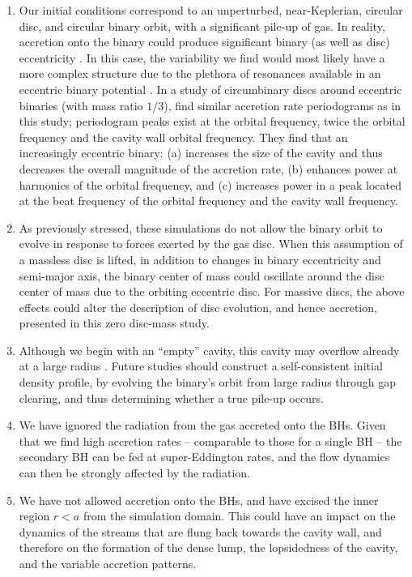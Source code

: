 \begin{enumerate}
\item Our initial conditions correspond to an unperturbed,
  near-Keplerian, circular disc, and circular binary orbit, with a
  significant pile-up of gas.  In reality, accretion onto the binary
  could produce significant binary (as well as disc) eccentricity
  \citep[\textit{e.g.}][]{Cuadra:2009, Lodato:2009, Roedig:2011:eccevo}.
  In this case, the variability we find would most likely have a more
  complex structure \citep[\textit{e.g.}][]{Hayasaki:2007} due to the
  plethora of resonances available in an eccentric binary potential
  \citep[\textit{e.g.}][]{AL94}. 
In a study of circumbinary discs around eccentric binaries (with mass ratio $1/3$), \citealt{Roedig:2011:eccevo} find similar accretion rate periodograms as in this study; periodogram peaks exist at the orbital frequency, twice the orbital frequency and the cavity wall orbital frequency. They find that an increasingly eccentric binary: (a) increases the size of the cavity and thus decreases the overall magnitude of the accretion rate, (b) enhances power at harmonics of the orbital frequency, and (c) increases power in a peak located at the beat frequency of the orbital frequency and the cavity wall frequency.
\item As previously stressed, these simulations do not allow the binary orbit to evolve in response to forces exerted by the gas disc. When this assumption of a massless disc is lifted, in addition to changes in binary eccentricity and semi-major axis, the binary center of mass could oscillate around the disc center of mass due to the orbiting eccentric disc. For massive discs, the above effects could alter the description of disc evolution, and hence accretion, presented in this zero disc-mass study.
%
\item Although we begin with an ``empty'' cavity, this cavity may 
  overflow already at a large radius \citep{Kocsis+2012b}.
  Future studies should construct a self-consistent initial density
  profile, by evolving the binary's orbit from large radius through
  gap clearing, and thus determining whether a true pile-up occurs.
\item We have ignored the radiation from the gas accreted onto the
  BHs.  Given that we find high accretion rates -- comparable to those
  for a single BH -- the secondary BH can be fed at super-Eddington
  rates, and the flow dynamics can then be strongly affected by the
  radiation.
\item We have not allowed accretion onto the BHs, and have excised the
  inner region $r<a$ from the simulation domain.  This could have an
  impact on the dynamics of the streams that are flung back towards
  the cavity wall, and therefore on the formation of the dense lump,
  the lopsidedness of the cavity, and the variable accretion patterns.
\end{enumerate}

